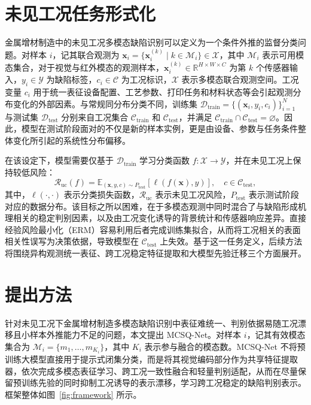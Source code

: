 \documentclass[journal]{IEEEtran}
\begin{document}
\section{未见工况任务形式化}

金属增材制造中的未见工况多模态缺陷识别可以定义为一个条件外推的监督分类问题。对样本 $i$，记其联合观测为 $\mathbf{x}_i=\{\mathbf{x}_i^{(k)}\mid k\in\mathcal{M}_i\}\in\mathcal{X}$，其中 $\mathcal{M}_i$ 表示可用模态集合，对于视觉与红外模态的观测样本，$\mathbf{x}_i^{(k)}\in\mathbb{R}^{H\times W\times C}$ 为第 $k$ 个传感器输入，$y_i\in\mathcal{Y}$ 为缺陷标签，$c_i\in\mathcal{C}$ 为工况标识，$\mathcal{X}$ 表示多模态联合观测空间。工况变量 $c_i$ 用于统一表征设备配置、工艺参数、打印任务和材料状态等会引起观测分布变化的外部因素。与常规同分布分类不同，训练集 $\mathcal{D}_{\mathrm{train}}=\{(\mathbf{x}_i,y_i,c_i)\}_{i=1}^{N}$ 与测试集 $\mathcal{D}_{\mathrm{test}}$ 分别来自工况集合 $\mathcal{C}_{\mathrm{train}}$ 和 $\mathcal{C}_{\mathrm{test}}$，并满足 $\mathcal{C}_{\mathrm{train}}\cap\mathcal{C}_{\mathrm{test}}=\varnothing$。因此，模型在测试阶段面对的不仅是新的样本实例，更是由设备、参数与任务条件整体变化所引起的系统性分布偏移。

在该设定下，模型需要仅基于 $\mathcal{D}_{\mathrm{train}}$ 学习分类函数 $f:\mathcal{X}\rightarrow\mathcal{Y}$，并在未见工况上保持较低风险：
\begin{equation}
\mathcal{R}_{\mathrm{uc}}(f)=\mathbb{E}_{(\mathbf{x},y,c)\sim P_{\mathrm{test}}}\left[\ell\!\left(f(\mathbf{x}),y\right)\right], \quad c\in\mathcal{C}_{\mathrm{test}},
\label{eq:uc_risk}
\end{equation}
其中，$\ell(\cdot,\cdot)$ 表示分类损失函数，$\mathcal{R}_{\mathrm{uc}}$ 表示未见工况风险，$P_{\mathrm{test}}$ 表示测试阶段对应的数据分布。该目标之所以困难，在于多模态观测中同时混合了与缺陷形成机理相关的稳定判别因素，以及由工况变化诱导的背景统计和传感器响应差异。直接经验风险最小化（ERM）容易利用后者完成训练集拟合，从而将工况相关的表面相关性误写为决策依据，导致模型在 $\mathcal{C}_{\mathrm{test}}$ 上失效。基于这一任务定义，后续方法将围绕异构观测统一表征、跨工况稳定特征提取和大模型先验迁移三个方面展开。

\section{提出方法}

针对未见工况下金属增材制造多模态缺陷识别中表征难统一、判别依据易随工况漂移且小样本外推能力不足的问题，本文提出 MCSQ-Net。对样本 $i$，记其有效模态集合为 $\mathcal{M}_i=\{m_1,\dots,m_{K_i}\}$，其中 $K_i$ 表示参与融合的模态数。MCSQ-Net 不将预训练大模型直接用于提示式闭集分类，而是将其视觉编码部分作为共享特征提取器，依次完成多模态表征学习、跨工况一致性融合和轻量判别适配，从而在尽量保留预训练先验的同时抑制工况诱导的表示漂移，学习跨工况稳定的缺陷判别表示。框架整体如图~\ref{fig:framework} 所示。
\end{document}
